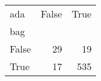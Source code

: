 \begin{tabular}{lrr}
\toprule
ada &  False &  True  \\
bag   &        &        \\
\midrule
False &     29 &     19 \\
True  &     17 &    535 \\
\bottomrule
\end{tabular}
